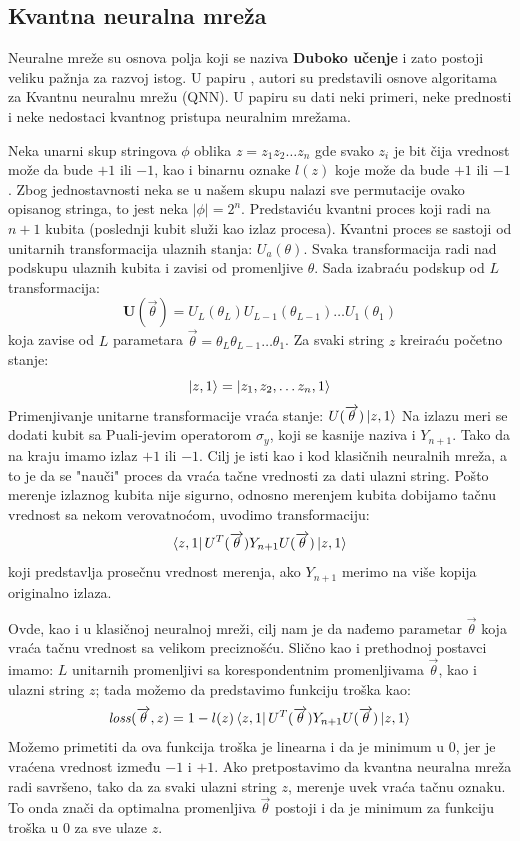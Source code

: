 \documentclass[12pt, letterpaper, oneside]{article}
\begin{document}
\subsection{Kvantna neuralna mreža}
Neuralne mreže su osnova polja koji se naziva \textbf{Duboko učenje} i zato postoji veliku pažnja za razvoj istog.
U papiru \cite{Classification_wit_QNN}, autori su predstavili osnove algoritama za Kvantnu neuralnu mrežu (QNN).
U papiru su dati neki primeri, neke prednosti i neke nedostaci kvantnog pristupa neuralnim mrežama.

Neka unarni skup stringova $\phi$ oblika $z=z_1 z_2 \dots z_n$ gde svako $z_i$ je bit čija vrednost može da bude $+1$ ili $-1$,
kao i binarnu oznake $l(z)$ koje može da bude $+1$ ili $-1$. Zbog jednostavnosti neka se u našem skupu nalazi sve permutacije ovako opisanog stringa, to jest neka $|\phi|=2^n$.
Predstaviću kvantni proces koji radi na $n+1$ kubita (poslednji kubit služi kao izlaz procesa). Kvantni proces se sastoji od unitarnih transformacija ulaznih stanja: ${U_a(\theta)}$.
Svaka transformacija radi nad podskupu ulaznih kubita i zavisi od promenljive $\theta$. Sada izabraću podskup od $L$ transformacija:
\[
  \mathbf{U}(\overrightarrow{\theta}) = U_{L}(\theta_{L}) U_{L-1}(\theta_{L-1}) \dots U_{1}(\theta_{1}) 
\]
koja zavise od $L$ parametara $\overrightarrow{\theta}=\theta_{L} \theta_{L-1} \dots \theta_{1}$. Za svaki string $z$ kreiraću početno stanje:
\[
    \Ket{z,1} = \Ket{z_1, z_2, \dots z_n, 1}
\]
Primenjivanje unitarne transformacije vraća stanje: $U(\overrightarrow{\theta})\Ket{z,1}$
Na izlazu meri se dodati kubit sa Puali-jevim operatorom $\sigma_y$, koji se kasnije naziva i $Y_{n+1}$.
Tako da na kraju imamo izlaz $+1$ ili $-1$. Cilj je isti kao i kod klasičnih neuralnih mreža, a to je da se "nauči" proces da vraća tačne vrednosti za dati ulazni string.
Pošto merenje izlaznog kubita nije sigurno, odnosno merenjem kubita dobijamo tačnu vrednost sa nekom verovatnoćom, uvodimo transformaciju:
\[
    \bra{z,1}U^T(\overrightarrow{\theta})Y_{n+1}U(\overrightarrow{\theta})\Ket{z,1}
\]
koji predstavlja prosečnu vrednost merenja, ako $Y_{n+1}$ merimo na više kopija originalno izlaza.

Ovde, kao i u klasičnoj neuralnoj mreži, cilj nam je da nađemo parametar $\overrightarrow{\theta}$ koja vraća tačnu vrednost sa velikom preciznošću.
Slično kao i prethodnoj postavci imamo: $L$ unitarnih promenljivi sa korespondentnim promenljivama $\overrightarrow{\theta}$, kao i ulazni string $z$; 
tada možemo da predstavimo funkciju troška kao:
\[
    \mathit{loss}(\overrightarrow{\theta},z) = 1 - l(z)\bra{z,1}U^T(\overrightarrow{\theta})Y_{n+1}U(\overrightarrow{\theta})\Ket{z,1}
\]
Možemo primetiti da ova funkcija troška je linearna i da je minimum u $0$, jer je vraćena vrednost između $-1$ i $+1$.
Ako pretpostavimo da kvantna neuralna mreža radi savršeno, tako da za svaki ulazni string $z$, merenje uvek vraća tačnu oznaku.
To onda znači da optimalna promenljiva $\overrightarrow{\theta}$ postoji i da je minimum za funkciju troška u $0$ za sve ulaze $z$.
\end{document}
